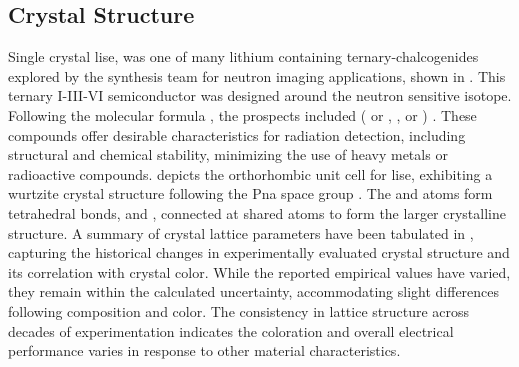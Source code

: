 \documentclass[../../../main.tex]{subfiles}
\begin{document}
%
    \subsection{Crystal Structure}%
    \label{sec:chapter-2:lise:crystal-structure}%
    Single crystal \gls{lise}, was one of many lithium containing \glspl{ternary-chalcogenide} explored by the synthesis team for neutron imaging applications, shown in .
    This ternary I-III-VI semiconductor was designed around the neutron sensitive  isotope.
    Following the molecular formula , the prospects included  (  or ,  ,  or ) \cite{Tupitsyn_2014}.
    These compounds offer desirable characteristics for radiation detection, including structural and chemical stability, minimizing the use of heavy metals or radioactive compounds.
     depicts the orthorhombic unit cell for \gls{lise}, exhibiting a wurtzite crystal structure following the Pna space group \cite{Wiggins_2016}.
    The  and  atoms form tetrahedral bonds,  and , connected at shared  atoms to form the larger crystalline structure.
    A summary of crystal lattice parameters have been tabulated in , capturing the historical changes in experimentally evaluated crystal structure and its correlation with crystal color.
    While the reported empirical values have varied, they remain within the calculated uncertainty, accommodating slight differences following composition and color.
    The consistency in lattice structure across decades of experimentation indicates the coloration and overall electrical performance varies in response to other material characteristics.
\end{document}
